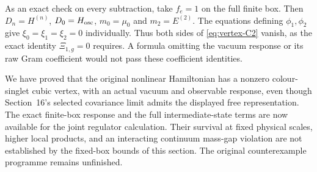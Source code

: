 As an exact check on every subtraction, take $f_e=1$ on the full
finite box. Then $D_n=H^{(n)}$, $D_0=H_{\rm osc}$,
$m_0=\mu_0$ and $m_2=E^{(2)}$. The equations defining
$\phi_1,\phi_2$ give $\xi_0=\xi_1=\xi_2=0$ individually.
Thus both sides of \eqref{eq:vertex-C2} vanish, as the exact
identity $\Xi_{1,g}=0$ requires. A formula omitting the vacuum
response or its raw Gram coefficient would not pass these
coefficient identities.

We have proved that the original nonlinear Hamiltonian has a nonzero
colour-singlet cubic vertex, with an actual vacuum and observable
response, even though Section~16's selected covariance limit admits
the displayed free representation. The exact finite-box response
and the full intermediate-state terms are now available for the
joint regulator calculation. Their survival at fixed physical
scales, higher local products, and an interacting continuum
mass-gap violation are not established by the fixed-box bounds
of this section. The original counterexample programme remains
unfinished.
